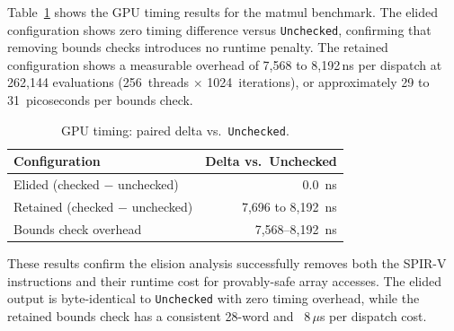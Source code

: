 \documentclass[11pt,a4paper]{article}
\begin{document}
Table~\ref{tab:gpu_timing} shows the GPU timing results for the matmul
benchmark. The elided configuration shows zero timing difference versus
\texttt{Unchecked}, confirming that removing bounds checks introduces no
runtime penalty. The retained configuration shows a measurable overhead of
7,568 to 8,192\,ns per dispatch at 262,144 evaluations (256~threads $\times$
1024~iterations), or approximately 29 to 31~picoseconds per bounds check.

\begin{table}[htbp]
\centering
\caption{GPU timing: paired delta vs.\ \texttt{Unchecked}.}
\label{tab:gpu_timing}
\small
\begin{tabular}{lr}
\toprule
Configuration & Delta vs.\ Unchecked \\
\midrule
Elided (checked $-$ unchecked) & 0.0~ns \\
Retained (checked $-$ unchecked) & 7,696 to 8,192~ns \\
\midrule
Bounds check overhead & 7,568--8,192~ns \\
\bottomrule
\end{tabular}
\end{table}

These results confirm the elision analysis successfully removes both the
SPIR-V instructions and their runtime cost for provably-safe array accesses.
The elided output is byte-identical to \texttt{Unchecked} with zero timing
overhead, while the retained bounds check has a consistent 28-word and
~8\,$\mu$s per dispatch cost.
\end{document}

